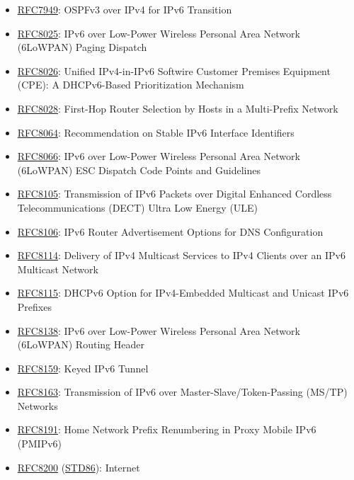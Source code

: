 \documentclass[
]{article}
\begin{document}
\begin{itemize}
\item
  \href{https://www.rfc-editor.org/info/rfc7949}{RFC7949}: OSPFv3 over
  IPv4 for IPv6 Transition
\item
  \href{https://www.rfc-editor.org/info/rfc8025}{RFC8025}: IPv6 over
  Low-Power Wireless Personal Area Network (6LoWPAN) Paging Dispatch
\item
  \href{https://www.rfc-editor.org/info/rfc8026}{RFC8026}: Unified
  IPv4-in-IPv6 Softwire Customer Premises Equipment (CPE): A
  DHCPv6-Based Prioritization Mechanism
\item
  \href{https://www.rfc-editor.org/info/rfc8028}{RFC8028}: First-Hop
  Router Selection by Hosts in a Multi-Prefix Network
\item
  \href{https://www.rfc-editor.org/info/rfc8064}{RFC8064}:
  Recommendation on Stable IPv6 Interface Identifiers
\item
  \href{https://www.rfc-editor.org/info/rfc8066}{RFC8066}: IPv6 over
  Low-Power Wireless Personal Area Network (6LoWPAN) ESC Dispatch Code
  Points and Guidelines
\item
  \href{https://www.rfc-editor.org/info/rfc8105}{RFC8105}: Transmission
  of IPv6 Packets over Digital Enhanced Cordless Telecommunications
  (DECT) Ultra Low Energy (ULE)
\item
  \href{https://www.rfc-editor.org/info/rfc8106}{RFC8106}: IPv6 Router
  Advertisement Options for DNS Configuration
\item
  \href{https://www.rfc-editor.org/info/rfc8114}{RFC8114}: Delivery of
  IPv4 Multicast Services to IPv4 Clients over an IPv6 Multicast Network
\item
  \href{https://www.rfc-editor.org/info/rfc8115}{RFC8115}: DHCPv6 Option
  for IPv4-Embedded Multicast and Unicast IPv6 Prefixes
\item
  \href{https://www.rfc-editor.org/info/rfc8138}{RFC8138}: IPv6 over
  Low-Power Wireless Personal Area Network (6LoWPAN) Routing Header
\item
  \href{https://www.rfc-editor.org/info/rfc8159}{RFC8159}: Keyed IPv6
  Tunnel
\item
  \href{https://www.rfc-editor.org/info/rfc8163}{RFC8163}: Transmission
  of IPv6 over Master-Slave/Token-Passing (MS/TP) Networks
\item
  \href{https://www.rfc-editor.org/info/rfc8191}{RFC8191}: Home Network
  Prefix Renumbering in Proxy Mobile IPv6 (PMIPv6)
\item
  \href{https://www.rfc-editor.org/info/rfc8200}{RFC8200}
  (\href{https://www.rfc-editor.org/info/std86}{STD86}): Internet

\end{itemize}
\end{document}

